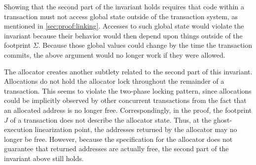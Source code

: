 Showing that the second part of the invariant holds requires that code within a
transaction must not access global state outside of the
transaction system, as mentioned in \autoref{sec:proof:linking}. Accesses to such global state
would violate the invariant because their behavior would then depend upon
things outside of the footprint $\Sigma$. Because those global values could change
by the time the transaction commits, the above argument would no longer work if they were allowed.

The allocator creates another subtlety related to the second part of this
invariant. Allocations do not hold the allocator lock throughout the remainder
of a transaction. This seems to violate the two-phase locking pattern, since
allocations could be implicitly observed by other concurrent transactions from
the fact that an allocated address is no longer free. Correspondingly, in the
proof, the footprint $J$ of a transaction does not describe the allocator state.
Thus, at the ghost-execution linearization point, the addresses returned by the
allocator may no longer be free. However, because the specification for the
allocator does not guarantee that returned addresses are actually free, the
second part of the invariant above still holds.



